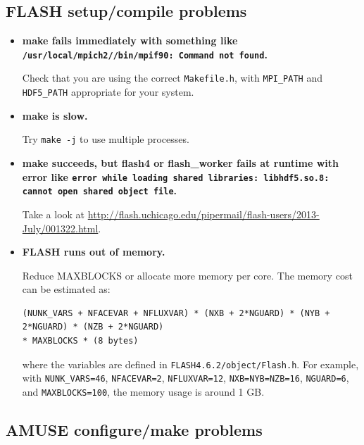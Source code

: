 \documentclass[10pt]{article}
\begin{document}
\subsection{FLASH setup/compile problems}

\begin{itemize}

    \item \textbf{make fails immediately with something like
        \texttt{/usr/local/mpich2//bin/mpif90: Command not found}.}

        Check that you are using the correct \texttt{Makefile.h}, with
        \texttt{MPI\_PATH} and \texttt{HDF5\_PATH} appropriate for your system.

    \item \textbf{make is slow.}

        Try \texttt{make -j} to use multiple processes.

    \item \textbf{make succeeds, but flash4 or flash\_worker fails at runtime with
        error like \texttt{error while loading shared libraries: libhdf5.so.8:
        cannot open shared object file}.}

        Take a look at \url{http://flash.uchicago.edu/pipermail/flash-users/2013-July/001322.html}.

    \item \textbf{FLASH runs out of memory.}

        Reduce MAXBLOCKS or allocate more memory per core.
        The memory cost can be estimated as:
\begin{verbatim}
(NUNK_VARS + NFACEVAR + NFLUXVAR) * (NXB + 2*NGUARD) * (NYB + 2*NGUARD) * (NZB + 2*NGUARD)
* MAXBLOCKS * (8 bytes)
\end{verbatim}
        where the variables are defined in \texttt{FLASH4.6.2/object/Flash.h}.
        For example, with \texttt{NUNK\_VARS=46}, \texttt{NFACEVAR=2},
        \texttt{NFLUXVAR=12}, \texttt{NXB=NYB=NZB=16}, \texttt{NGUARD=6}, and
        \texttt{MAXBLOCKS=100}, the memory usage is around 1 GB.

\end{itemize}

\subsection{AMUSE configure/make problems}
\label{sec:help-amuse}
\end{document}
